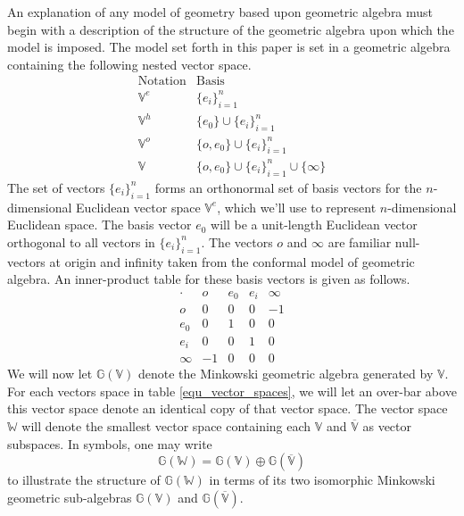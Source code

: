 \documentclass{birkjour}
\theoremstyle{definition}
\theoremstyle{remark}
\numberwithin{equation}{section}
\newcommand{\G}{\mathbb{G}}
\newcommand{\V}{\mathbb{V}}
\newcommand{\Vb}{\mathbb{\overline{V}}}
\newcommand{\W}{\mathbb{W}}
\newcommand{\nvao}{o}
\newcommand{\nvai}{\infty}
\begin{document}
An explanation of any model of geometry based upon geometric algebra must
begin with a description of the structure of the geometric algebra upon
which the model is imposed.  The model set forth in this paper is set in a
geometric algebra containing the following nested vector space.
\begin{equation}\label{equ_vector_spaces}
\begin{array}{ll}
\mbox{Notation} & \mbox{Basis} \\
\hline
\V^e & \{e_i\}_{i=1}^n \\
\V^h & \{e_0\}\cup\{e_i\}_{i=1}^n \\
\V^o & \{\nvao,e_0\}\cup\{e_i\}_{i=1}^n \\
\V & \{\nvao,e_0\}\cup\{e_i\}_{i=1}^n\cup\{\nvai\}
\end{array}
\end{equation}
The set of vectors $\{e_i\}_{i=1}^n$ forms an orthonormal set of basis
vectors for the $n$-dimensional Euclidean vector space $\V^e$, which we'll
use to represent $n$-dimensional Euclidean space.  The basis vector $e_0$
will be a unit-length Euclidean vector orthogonal to all vectors in $\{e_i\}_{i=1}^n$.
The vectors $\nvao$ and $\nvai$ are familiar null-vectors at origin and infinity
taken from the conformal model of geometric algebra.  An inner-product
table for these basis vectors is given as follows.
\begin{equation}
\begin{array}{c|cccc}
\cdot & \nvao & e_0 & e_i & \nvai \\
\hline
\nvao & 0 & 0 & 0 & -1 \\
e_0 & 0 & 1 & 0 & 0 \\
e_i & 0 & 0 & 1 & 0 \\
\nvai & -1 & 0 & 0 & 0
\end{array}
\end{equation}
We will now let $\G(\V)$ denote the Minkowski geometric algebra generated by $\V$.
For each vectors space in table \eqref{equ_vector_spaces}, we will let an over-bar
above this vector space denote an identical copy of that vector space.  The vector
space $\W$ will denote the smallest vector space containing each $\V$ and $\Vb$
as vector subspaces.  In symbols, one may write
\begin{equation}
\G(\W) = \G(\V)\oplus\G(\Vb)
\end{equation}
to illustrate the structure of $\G(\W)$ in terms of its two isomorphic Minkowski
geometric sub-algebras $\G(\V)$ and $\G(\Vb)$.
\end{document}

